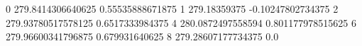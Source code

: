 0 279.8414306640625 0.55535888671875
1 279.18359375 -0.10247802734375
2 279.93780517578125 0.6517333984375
4 280.0872497558594 0.801177978515625
6 279.96600341796875 0.679931640625
8 279.28607177734375 0.0
